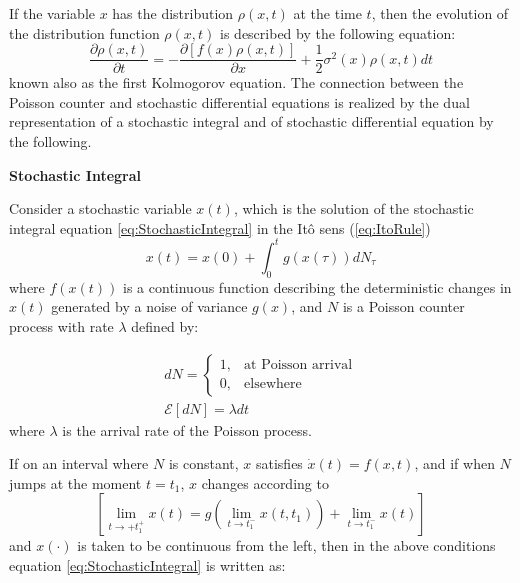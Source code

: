 If the variable $x$ has the distribution $\rho(x,t)$ at the time $t$, then the evolution of the distribution 
function $\rho(x,t)$ is described by the following equation:
\begin{equation}
\frac{\partial \rho(x,t)}{\partial t} = -\frac{\partial\left[f(x) \rho(x,t)\right]}{\partial x} + 
{\frac{1}{2}}{\sigma^{2}(x)\rho(x,t)}dt 
\label{eq:Kolmogorov1}
\end{equation}
known also as the first Kolmogorov equation.
The connection between the Poisson counter and stochastic differential equations is realized by the dual representation of a stochastic integral and of stochastic differential equation by the following.

\begin{definition}
\textbf{Stochastic Integral}
\end{definition}
Consider a stochastic variable $x(t)$, which is the solution of the stochastic integral equation \ref{eq:StochasticIntegral} in the It\^o sens (\ref{eq:ItoRule})
\begin{equation}
 x(t) = x(0) + \int_{0}^{t} g(x(\tau))dN_{\tau}
\label{eq:StochasticIntegral}
\end{equation}
where $f(x(t))$ is a continuous function describing the deterministic changes in $x(t)$ generated by a noise of variance $g(x)$, and $N$ is a Poisson counter process with rate $\lambda$ defined by:

\begin{equation} 
\begin{array}{lcl} 
dN = \begin{cases} 1, & \mbox{at Poisson arrival} \\ 0, & \mbox{elsewhere} \end{cases}\\
\mathcal{E}[dN] = \lambda dt 
\end{array}
\label{eq:NPoisson}
\end{equation}
where $\lambda$ is the arrival rate of the Poisson process.

If on an interval where $N$ is constant, $x$ satisfies $\dot{x}(t) = f(x,t)$, and if when $N$ jumps at the moment $t=t_{1}$, $x$ changes according to 
\begin{equation}
\left[ \lim_{t \to + t_{1}^{+}} x(t) = g ( \lim_{t \to t_{1}^{-}} x(t,t_{1})) + \lim_{t \to t_{1}^{-}} x(t) \right]
\end{equation}
and $x(\cdot)$ is taken to be continuous from the left, then in the above conditions equation \ref{eq:StochasticIntegral} is written as:

